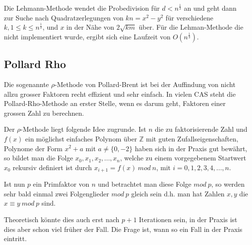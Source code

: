 \documentclass[10pt, bigheadings]{scrartcl}
\begin{document}
Die Lehmann-Methode wendet die Probedivision für $d<n^\frac{1}{3}$ an und geht dann
zur Suche nach Quadratzerlegungen von
$kn = x^2 - y^2$ für verschiedene $k, 1\leq k \leq n^{\frac{1}{3}}$, und $x$ in der
Nähe von $2\sqrt{km}$ über. Für die Lehman-Methode die nicht implementiert wurde,
ergibt sich eine Laufzeit von $O(n^{\frac{1}{3}})$.

\subsection{Pollard Rho}

Die sogenannte $\rho$-Methode von Pollard-Brent ist bei der Auffindung
von nicht allzu grosser Faktoren recht effizient und sehr einfach. In
vielen CAS steht die Pollard-Rho-Methode an erster Stelle, wenn es darum
geht, Faktoren einer grossen Zahl zu berechnen.

Der $\rho$-Methode liegt folgende Idee zugrunde. Ist $n$ die zu
faktorisierende Zahl und $f(x)$ ein möglichst einfaches Polynom
über ${\mathbb Z}$ mit guten Zufallseigenschaften, Polynome der
Form $x^2+a$ mit $ a \neq \{0,-2\}$ haben sich in der Praxis gut
bewährt, so bildet man die  Folge $x_0, x_1, x_2,..., x_n$, welche zu
einem vorgegebenem Startwert $x_0$ rekursiv definiert ist durch
 $x_{i+1} = f(x)\ mod\ n$, mit $i = 0,1,2,3,4,..., n$.

Ist nun $p$ ein Primfaktor von $n$ und betrachtet man diese Folge $mod\ p$,
so werden sehr bald einmal zwei Folgenglieder $mod\ p$ gleich sein d.h. man
hat Zahlen $x,y$ die $x\equiv y\ mod\ p$ sind.

Theoretisch könnte dies auch erst nach $p+1$ Iterationen sein, in der Praxis
ist dies aber schon viel früher der Fall. Die Frage ist, wann so ein
Fall in der Praxis eintritt.
\end{document}
